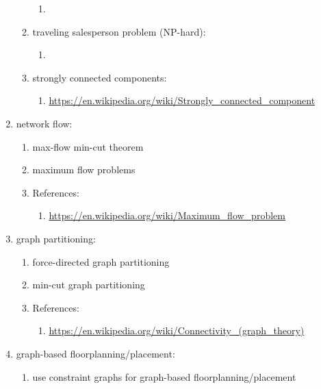 \begin{enumerate}
\begin{enumerate}
\begin{enumerate}
		\item 
		\end{enumerate}
	\item traveling salesperson problem (NP-hard): \vspace{-0.2cm}
		\begin{enumerate} \itemsep -2pt
		\item 
		\end{enumerate}
	\item strongly connected components: \vspace{-0.2cm}
		\begin{enumerate} \itemsep -2pt
		\item \url{https://en.wikipedia.org/wiki/Strongly_connected_component}
		\end{enumerate}
	\end{enumerate}
\item network flow: \vspace{-0.3cm}
	\begin{enumerate} \itemsep -2pt
	\item max-flow min-cut theorem
	\item maximum flow problems
	\item References: \vspace{-0.2cm}
		\begin{enumerate} \itemsep -2pt
		\item \url{https://en.wikipedia.org/wiki/Maximum_flow_problem}
		\end{enumerate}
	\end{enumerate}
\item graph partitioning: \vspace{-0.3cm}
	\begin{enumerate} \itemsep -2pt
	\item force-directed graph partitioning
	\item min-cut graph partitioning
	\item References: \vspace{-0.2cm}
		\begin{enumerate} \itemsep -2pt
		\item \url{https://en.wikipedia.org/wiki/Connectivity_(graph_theory)}
		\end{enumerate}
	\end{enumerate}
\item graph-based floorplanning/placement: \vspace{-0.3cm}
	\begin{enumerate} \itemsep -2pt
	\item use constraint graphs for graph-based floorplanning/placement

\end{enumerate}
\end{enumerate}
